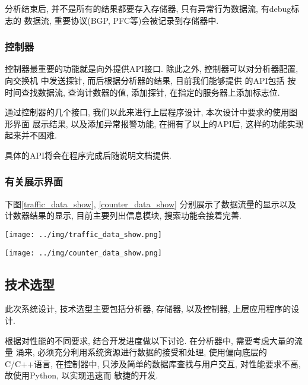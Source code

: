 {\begin{mdframed}[everyline=true]
分析结束后, 并不是所有的结果都要存入存储器, 只有异常行为数据流,
有debug标志的 数据流, 重要协议(BGP, PFC等)会被记录到存储器中.

\subsubsection{控制器}

控制器最重要的功能就是向外提供API接口. 除此之外, 控制器可以对分析器配置,
向交换机 中发送探针, 而后根据分析器的结果, 目前我们能够提供 的API包括
按时间查找数据流, 查询计数器的值, 添加探针, 在指定的服务器上添加标志位.

通过控制器的几个接口, 我们以此来进行上层程序设计,
本次设计中要求的使用图形界面 展示结果, 以及添加异常报警功能,
在拥有了以上的API后, 这样的功能实现起来并不困难.

具体的API将会在程序完成后随说明文档提供.


\subsubsection{有关展示界面}

下图\ref{traffic_data_show}, \ref{counter_data_show}
分别展示了数据流量的显示以及
计数器结果的显示, 目前主要列出信息模块, 搜索功能会接着完善.

\begin{center}
    \texttt{[image: ../img/traffic\_data\_show.png]}
    \label{traffic_data_show}
\end{center}

\begin{center}
    \texttt{[image: ../img/counter\_data\_show.png]}
    \label{counter_data_show}
\end{center}


\subsection{技术选型}

此次系统设计, 技术选型主要包括分析器, 存储器, 以及控制器, 上层应用程序的设计.

根据对性能的不同要求, 结合开发进度做以下讨论. 在分析器中, 需要考虑大量的流量
涌来, 必须充分利用系统资源进行数据的接受和处理, 使用偏向底层的C/C++语言, 在控制器中, 只涉及简单的数据库查找与用户交互,
对性能要求不高, 故使用Python, 以实现迅速而
敏捷的开发.


\end{mdframed}}
